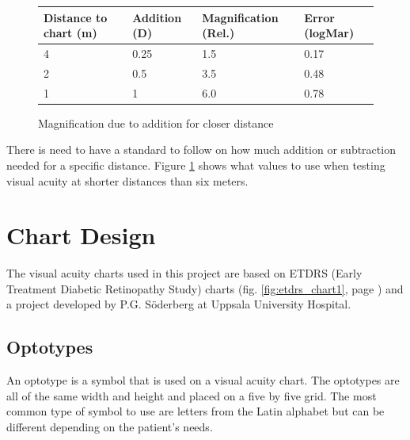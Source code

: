 \documentclass[12pt,a4paper,notitlepage]{report}
\begin{document}
\newpage
\begin{figure}[h]
\centering
\begin{tabular}{| l | l | l | l |}
    \hline
    Distance to chart (m) & Addition (D) & Magnification (Rel.) & Error (logMar) \\ \hline
    4                     & 0.25         & 1.5                  & 0.17           \\ \hline
    2                     & 0.5          & 3.5                  & 0.48           \\ \hline
    1                     & 1            & 6.0                  & 0.78           \\ 
    \hline
    \end{tabular}
    \caption{Magnification due to addition for closer distance\label{magtable}}
\end{figure}

There is need to have a standard to follow on how much addition or subtraction needed for a specific distance. Figure \ref{magtable} shows what values to use when testing visual acuity at shorter distances than six meters. \cite{PGSoderberg}

\section{Chart Design}
The visual acuity charts used in this project are based on ETDRS (Early Treatment Diabetic Retinopathy Study) charts (fig. \ref{fig:etdrs_chart1}, page \pageref{fig:etdrs_chart1}) \cite{Ferris} and a project developed by P.G. Söderberg \cite{PGSoderbergOral} at Uppsala University Hospital. 


\subsection{Optotypes} \label{Optotypes}
An optotype is a symbol that is used on a visual acuity chart. The optotypes are all of the same width and height and placed on a five by five grid. The most common type of symbol to use are letters from the Latin alphabet but can be different depending on the patient's needs\cite{Colenbrander}.
\end{document}
